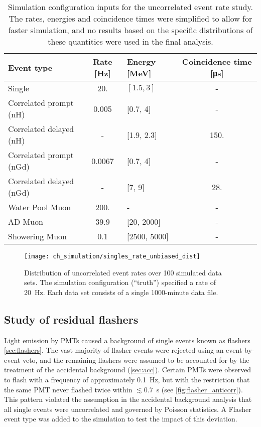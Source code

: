 \begin{table}[ht]
    \centering
    \begin{tabular}[t]{lSlS}
        \toprule
        Event type & {Rate [\si{\Hz}]} & Energy [\si{\MeV}] & {Coincidence time [\si{\us}]}\\
        \midrule
        Single & 20. & $[\num{1.5}, \num{3}]$ & {-}\\
        Correlated prompt (nH) & 0.005 & [0.7, 4] & {-} \\
        Correlated delayed (nH) & {-} & [1.9, 2.3] & 150. \\
        Correlated prompt (nGd) & 0.0067 & [0.7, 4] & {-} \\
        Correlated delayed (nGd) & {-} & [7, 9] & 28. \\
        Water Pool Muon & 200. & - & {-} \\
        AD Muon & 39.9 & [\num{20}, \num{2000}] & {-}\\
        Showering Muon & 0.1 & [\num{2500}, \num{5000}] & {-}\\
        \bottomrule
    \end{tabular}
    \caption[Uncorrelated event simulation inputs]{
        Simulation configuration inputs for the uncorrelated event rate study.
        The rates, energies and coincidence times were simplified
        to allow for faster simulation,
        and no results based on the specific distributions of these quantities
        were used in the final analysis.
    }
    \label{tab:toymc_singles_config}
\end{table}

\begin{figure}
    \centering
    \texttt{[image: ch\_simulation/singles\_rate\_unbiased\_dist]}
    \caption[Extracted simulated uncorrelated event rates]{
        Distribution of uncorrelated event rates over 100 simulated data sets.
        The simulation configuration (``truth'') specified a rate of \SI{20}{\Hz}.
        Each data set consists of a single 1000-minute data file.
    }
    \label{fig:toymc_singles_dist}
\end{figure}

\subsection{Study of residual flashers}
\label{subsec:toymc_flashers}

Light emission by PMTs caused a background of single events
known as flashers \cref{sec:flashers}.
The vast majority of flasher events were rejected using an event-by-event veto,
and the remaining flashers were assumed to be accounted for
by the treatment of the accidental background (\cref{sec:acc}).
Certain PMTs were observed to flash with a frequency
of approximately \SI{0.1}{\Hz},
but with the restriction that
the same PMT never flashed twice within $\lesssim$\SI{0.7}{\s}
(see \cref{fig:flasher_anticorr}).
This pattern violated the assumption in the accidental background analysis
that all single events were uncorrelated and governed by Poisson statistics.
A Flasher event type was added to the simulation to test the impact of this deviation.

